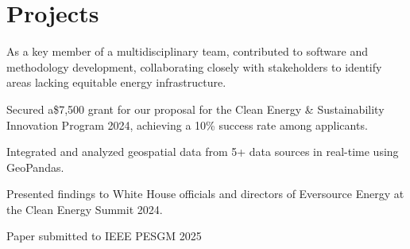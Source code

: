 \documentclass[]{resume-template}
\begin{document}
\begin{minipage}[t]{0.66\textwidth}
  \section{Projects}\label{sec:projects}
  \label{subsec:exo-eda}
  \begin{tightemize}
  \item As a key member of a multidisciplinary team, contributed to software and methodology development, collaborating closely with stakeholders to identify areas lacking equitable energy infrastructure.
  \item Secured a\$7,500 grant for our proposal for the Clean Energy \& Sustainability Innovation Program 2024, achieving a 10\% success rate among applicants.
  \item Integrated and analyzed geospatial data from 5+ data sources in real-time using GeoPandas.
  \item Presented findings to White House officials and directors of Eversource Energy at the Clean Energy Summit 2024.
  \item Paper submitted to IEEE PESGM 2025
  \end{tightemize}

\end{minipage}
\end{document}
